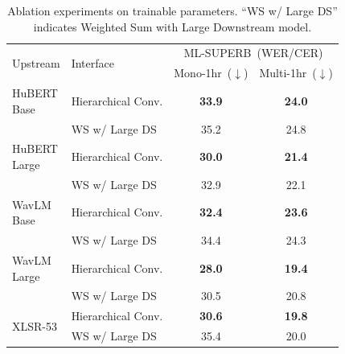 \begin{table}[th]
\scriptsize
\vspace{-5pt}
  \caption{Ablation experiments on trainable parameters. ``WS w/ Large DS'' indicates Weighted Sum with Large Downstream model.}
  \label{tab:ablation}
  \centering
  \begin{tabular}{ l l c c }
    \toprule
    \multirow{ 2}{*}{Upstream}  & \multirow{ 2}{*}{Interface} & \multicolumn{2}{c}{ML-SUPERB~(WER/CER)}    \\
    &  & Mono-1hr~($\downarrow$) & Multi-1hr~($\downarrow$) \\
    \midrule
    \multirowcell{ 2}{HuBERT\\Base} 
    &  Hierarchical Conv. &     \textbf{33.9} & \textbf{24.0} \\
    &  WS w/ Large DS &            35.2 & 24.8  \\
    \midrule

    \multirowcell{ 2}{HuBERT\\Large} 
    &  Hierarchical Conv.   &	\textbf{30.0} & \textbf{21.4}  \\
    &  WS w/ Large DS          &	32.9 & 22.1  \\
    \midrule


    \multirowcell{ 2}{WavLM\\Base} 
    &  Hierarchical Conv. &     \textbf{32.4} & \textbf{23.6} \\
    &  WS w/ Large DS &            34.4 & 24.3 \\
    \midrule

    \multirowcell{ 2}{WavLM\\Large} 
    &  Hierarchical Conv. &     \textbf{28.0} & \textbf{19.4} \\
    &  WS w/ Large DS &            30.5 & 20.8  \\
    \midrule

    \multirow{ 2}{*}{XLSR-53} 
    &  Hierarchical Conv. &     \textbf{30.6} & \textbf{19.8} \\
    &  WS w/ Large DS &            35.4 & 20.0 \\   

    \bottomrule
  \end{tabular}
  \vspace{-5pt}
\end{table}

